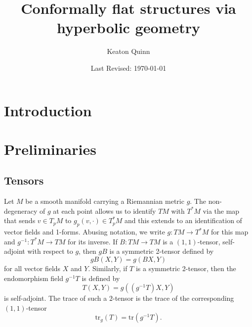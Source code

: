 \documentclass{amsart}
\newcommand{\tr}{\mathrm{tr}}
\begin{document}
\title{Conformally flat structures via hyperbolic geometry}
\author{Keaton Quinn}
\date{Last Revised: \today}

\begin{abstract}
\end{abstract}

\maketitle

\section{Introduction}

\section{Preliminaries}


\subsection{Tensors}

Let $M$ be a smooth manifold carrying a Riemannian metric $g$. 
The non-degeneracy of $g$ at each point allows us to identify $TM$ with $T^*M$ via the map that sends $v \in T_pM$ to $g_p(v,\cdot) \in T^*_pM$ and this extends to an identification of vector fields and 1-forms. 
Abusing notation, we write $g: TM \to T^*M$ for this map and $g^{-1}:T^*M \to TM$ for its inverse.
If $B:TM \to TM$ is a $(1,1)$-tensor, self-adjoint with respect to $g$, then $gB$ is a symmetric 2-tensor defined by
\[
gB(X,Y) = g(BX,Y)
\]
for all vector fields $X$ and $Y$.
Similarly, if $T$ is a symmetric 2-tensor, then the endomorphism field $g^{-1}T$ is defined by 
\[
T(X,Y) = g( (g^{-1}T)X,Y)
\]
is self-adjoint.
The trace of such a $2$-tensor is the trace of the corresponding $(1,1)$-tensor
\[
\tr_g(T) = \tr(g^{-1}T).
\]
\end{document}
